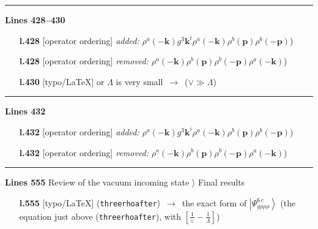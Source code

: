 \documentclass[10pt]{article}
\begin{document}
\noindent\rule{\linewidth}{0.3pt}\par\noindent\textbf{Lines 428--430} \par
\begin{itemize}[leftmargin=2.2em,itemsep=1pt,topsep=2pt]
\item[\textbf{l.428}] \textsf{\small [operator ordering]} \emph{added:} $\displaystyle \rho^{a}(-\mathbf{k})$$\displaystyle g^{3}\mathbf{k}^{i}\rho^{a}(-\mathbf{k})\rho^{b}(\mathbf{p})\rho^{b}(-\mathbf{p})${\color{gray}\small)}
\item[\textbf{l.428}] \textsf{\small [operator ordering]} \emph{removed:} $\displaystyle \rho^{a}(-\mathbf{k})$$\displaystyle \rho^{b}(\mathbf{p})\rho^{b}(-\mathbf{p})\rho^{a}(-\mathbf{k})${\color{gray}\small)}
\item[\textbf{l.430}] \textsf{\small [typo/LaTeX]} or $\Lambda$ is very small\ $\longrightarrow$\ ($\vee\gg\Lambda$)
\end{itemize}
\noindent\rule{\linewidth}{0.3pt}\par\noindent\textbf{Lines 432} \par
\begin{itemize}[leftmargin=2.2em,itemsep=1pt,topsep=2pt]
\item[\textbf{l.432}] \textsf{\small [operator ordering]} \emph{added:} $\displaystyle \rho^{a}(-\mathbf{k})$$\displaystyle g^{3}\mathbf{k}^{i}\rho^{a}(-\mathbf{k})\rho^{b}(\mathbf{p})\rho^{b}(-\mathbf{p})${\color{gray}\small)}
\item[\textbf{l.432}] \textsf{\small [operator ordering]} \emph{removed:} $\displaystyle \rho^{a}(-\mathbf{k})$$\displaystyle \rho^{b}(\mathbf{p})\rho^{b}(-\mathbf{p})\rho^{a}(-\mathbf{k})${\color{gray}\small)}
\end{itemize}
\noindent\rule{\linewidth}{0.3pt}\par\noindent\textbf{Lines 555} \quad \textsf{Review of the vacuum incoming state $\rangle$ Final results}\par
\begin{itemize}[leftmargin=2.2em,itemsep=1pt,topsep=2pt]
\item[\textbf{l.555}] \textsf{\small [typo/LaTeX]} (\texttt{threerhoafter})\ $\longrightarrow$\ the exact form of $\left|\Psi_{g\rho\rho\rho}^{6\,c}\right\rangle$ (the equation just above (\texttt{threerhoafter}), with $\left[\frac{1}{\vee}-\frac{1}{\Lambda}\right]$)
\end{itemize}
\end{document}
